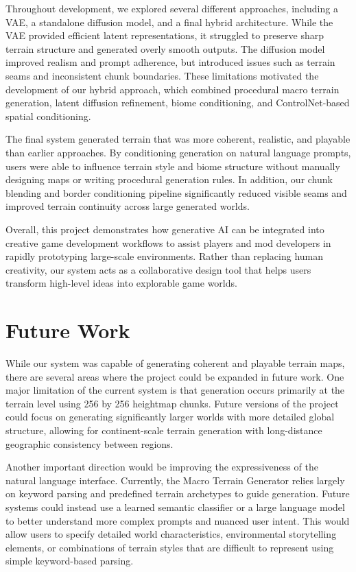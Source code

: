\documentclass[conference]{IEEEtran}
\begin{document}
Throughout development, we explored several different approaches, including a VAE, a standalone diffusion model, and a final hybrid architecture. While the VAE provided efficient latent representations, it struggled to preserve sharp terrain structure and generated overly smooth outputs. The diffusion model improved realism and prompt adherence, but introduced issues such as terrain seams and inconsistent chunk boundaries. These limitations motivated the development of our hybrid approach, which combined procedural macro terrain generation, latent diffusion refinement, biome conditioning, and ControlNet-based spatial conditioning.

The final system generated terrain that was more coherent, realistic, and playable than earlier approaches. By conditioning generation on natural language prompts, users were able to influence terrain style and biome structure without manually designing maps or writing procedural generation rules. In addition, our chunk blending and border conditioning pipeline significantly reduced visible seams and improved terrain continuity across large generated worlds.

Overall, this project demonstrates how generative AI can be integrated into creative game development workflows to assist players and mod developers in rapidly prototyping large-scale environments. Rather than replacing human creativity, our system acts as a collaborative design tool that helps users transform high-level ideas into explorable game worlds.

\section{Future Work}

While our system was capable of generating coherent and playable terrain maps, there are several areas where the project could be expanded in future work. One major limitation of the current system is that generation occurs primarily at the terrain level using 256 by 256 heightmap chunks. Future versions of the project could focus on generating significantly larger worlds with more detailed global structure, allowing for continent-scale terrain generation with long-distance geographic consistency between regions.

Another important direction would be improving the expressiveness of the natural language interface. Currently, the Macro Terrain Generator relies largely on keyword parsing and predefined terrain archetypes to guide generation. Future systems could instead use a learned semantic classifier or a large language model to better understand more complex prompts and nuanced user intent. This would allow users to specify detailed world characteristics, environmental storytelling elements, or combinations of terrain styles that are difficult to represent using simple keyword-based parsing.
\end{document}
